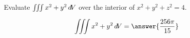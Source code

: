 \documentclass{ximera}
\author{David Guichard \and Neal Koblitz \and H. Jerome Keisler \and Albert Scheller \and Barry Balof \and Mike Wills \and Matthew Carr}
\begin{document}
\begin{exercise}




Evaluate $\iiint x^2+y^2 \mathop{}\!d\! V$ over the interior of $x^2+y^2+z^2=4$.

\begin{prompt}
\[
\iiint x^2+y^2 \d V=\answer{\frac{256\pi}{15}}
\]
\end{prompt}



\end{exercise}
\end{document}
